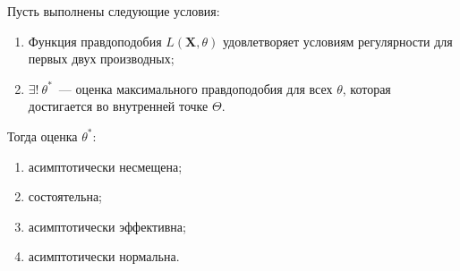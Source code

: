 \begin{thm*}
    Пусть выполнены следующие условия:
    \begin{enumerate}
        \item Функция правдоподобия $L(\mathbf{X}, \theta)$ удовлетворяет условиям регулярности для первых двух производных;
        \item $\exists!~ \theta^{*}$~--- оценка максимального правдоподобия для всех $\theta$, которая достигается во внутренней точке $\Theta$.
    \end{enumerate}
    Тогда оценка $\theta^{*}$:
    \begin{enumerate}
        \item асимптотически несмещена;
        \item состоятельна;
        \item асимптотически эффективна;
        \item асимптотически нормальна.
    \end{enumerate}
\end{thm*}